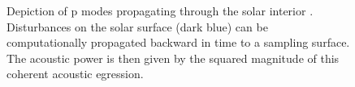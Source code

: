 \documentclass[11pt,a4paper,onecolumn]{report}
\begin{document}
\begin{figure}[t]%
  \centering
  \qquad
  \caption[]{ Depiction of p modes propagating through the solar
    interior \citep{Lindsey2017}.  Disturbances on the solar surface (dark blue) can be
    computationally propagated backward in time to a sampling surface. The
    acoustic power is then given by the squared magnitude of this coherent
    acoustic egression.\citep{Lindsey2011} }
\end{figure}
\end{document}
